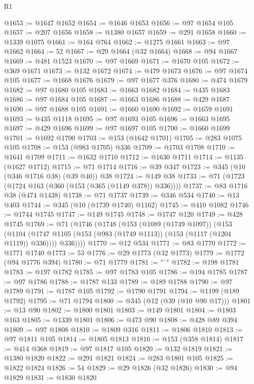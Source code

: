 \begin{lexlean}{R1}
\begin{coremodule}
@1653 := @1647 @1652
@1654 := @1646 @1653
@1656 := @97 @1654 @105
@1657 := @207 @1656
@1658 := @1380 @1657
@1659 := @291 @1658
@1660 := @1339 @1075
@1661 := @164 @764
@1662 := @1275 @1661
@1663 := @97 @1662
@1664 := 52
@1667 := @29 @1664 (@32 @1664)
@1668 := @94 @1667
@1669 := @481 @1523
@1670 := @97 @1669
@1671 := @1670 @105
@1672 := @369 @1671
@1673 := @132 @1672
@1674 := @479 @1673
@1676 := @97 @1674 @105
@1677 := @1668 @1676
@1679 := @97 @1677 @376
@1680 := @474 @1679
@1682 := @97 @1680 @105
@1683 := @1663 @1682
@1684 := @435 @1683
@1686 := @97 @1684 @105
@1687 := @1663 @1686
@1688 := @429 @1687
@1690 := @97 @1688 @105
@1691 := @1660 @1690
@1692 := @1659 @1691
@1693 := @435 @1118
@1695 := @97 @1693 @105
@1696 := @1663 @1695
@1697 := @429 @1696
@1699 := @97 @1697 @105
@1700 := @1660 @1699
@1701 := @1692 @1700
@1703 := @153 (@1642 @1701)
@1705 := @283 @1075 @105
@1708 := @153 (@983 @1705) @336
@1709 := @1703 @1708
@1710 := @1641 @1709
@1711 := @1632 @1710
@1712 := @1630 @1711
@1714 := @1135 (@1627 @1712)
@1715 := @71 @1714
@1716 := @39 @347
@1723 := @345 (@10 (@346 @1716 @38) (@39 @40)) @38
@1724 := @149 @38
@1733 := @71 (@1723 (@1724 @163 (@360 (@153 (@365 (@1149 @378)) @336))))
@1737 := @83 @1716 @38 (@474 @1438)
@1738 := @71 @1737
@1739 := @346 @534
@1740 := @13 @403
@1744 := @345 (@10 (@1739 @1740) @1162)
@1745 := @410 @1082
@1746 := @1744 @1745
@1747 := @149 @1745
@1748 := @1747 @120
@1749 := @428 @1745
@1769 := @71
    (@1746
      (@1748
        (@153
          (@1089 (@1749 @1097))
          (@153
            (@1104 (@1747 @1105 (@153 (@983 (@1749 @1113)) (@153 (@1117 (@1204 @1119)) @336))))
            @336))))
@1770 := @12 @534
@1771 := @83 @1770
@1772 := @1771 @1740
@1773 := 53
@1776 := @29 @1773 (@32 @1773)
@1779 := @1772 (@94 @1776 @394)
@1780 := @71 @1779
@1781 := "`"
@1782 := @198 @1781
@1783 := @197 @1782
@1785 := @97 @1783 @105
@1786 := @194 @1785
@1787 := @97 @1786
@1788 := @1787 @133
@1789 := @189 @1788
@1790 := @97 @1789
@1791 := @1787 @105
@1792 := @1790 @1791
@1794 := @1199 (@189 @1792)
@1795 := @71 @1794
@1800 := @345 (@12 (@39 (@10 @90 @17)))
@1801 := @13 @90
@1802 := @1800 @1801
@1803 := @149 @1801
@1804 := @1803 @163
@1805 := @1339 @1801
@1806 := @473 @90
@1808 := @428 @89 @394
@1809 := @97 @1808
@1810 := @1809 @316
@1811 := @1806 @1810
@1813 := @97 @1811 @105
@1814 := @1805 @1813
@1816 := @153 (@358 @1814)
@1817 := @414 @368
@1819 := @97 @1817 @105
@1820 := @132 @1819
@1821 := @1380 @1820
@1822 := @291 @1821
@1824 := @283 @1801 @105
@1825 := @1822 @1824
@1826 := 54
@1829 := @29 @1826 (@32 @1826)
@1830 := @94 @1829
@1831 := @1830 @1820

\end{coremodule}
\end{lexlean}
